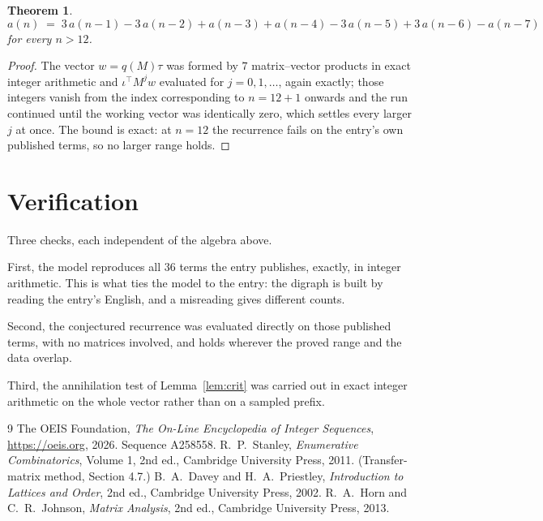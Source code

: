 \documentclass[11pt,a4paper]{article}
\theoremstyle{plain}
\newtheorem{theorem}{Theorem}
\theoremstyle{definition}
\begin{document}
\begin{theorem}
\[
a(n)\;=\;3\,a(n-1) - 3\,a(n-2) + a(n-3) + a(n-4) - 3\,a(n-5) + 3\,a(n-6) - a(n-7)
\]
for every $n>12$.
\end{theorem}

\begin{proof}
The vector $w=q(M)\tau$ was formed by $7$ matrix--vector products in exact integer
arithmetic and $\iota^{\!\top}M^{j}w$ evaluated for $j=0,1,\dots$, again exactly; those
integers vanish from the index corresponding to $n=12+1$ onwards and the run continued
until the working vector was identically zero, which settles every larger $j$ at once. The bound is exact: at $n=12$ the recurrence fails on the entry's own published terms, so no larger range holds.
\end{proof}

\section{Verification}

Three checks, each independent of the algebra above.

First, the model reproduces all $36$ terms the entry publishes, exactly, in integer
arithmetic. This is what ties the model to the entry: the digraph is built by reading the
entry's English, and a misreading gives different counts.

Second, the conjectured recurrence was evaluated directly on those published terms, with no
matrices involved, and holds wherever the proved range and the data overlap.

Third, the annihilation test of Lemma~\ref{lem:crit} was carried out in exact integer
arithmetic on the whole vector rather than on a sampled prefix.

\begin{thebibliography}{9}
 The OEIS Foundation, \emph{The On-Line Encyclopedia of Integer
Sequences}, \url{https://oeis.org}, 2026. Sequence A258558.
 R.~P.~Stanley, \emph{Enumerative Combinatorics}, Volume 1, 2nd ed.,
Cambridge University Press, 2011. (Transfer-matrix method, Section 4.7.)
 B.~A.~Davey and H.~A.~Priestley, \emph{Introduction to Lattices and
Order}, 2nd ed., Cambridge University Press, 2002.
 R.~A.~Horn and C.~R.~Johnson, \emph{Matrix Analysis}, 2nd ed., Cambridge
University Press, 2013.
\end{thebibliography}
\end{document}
